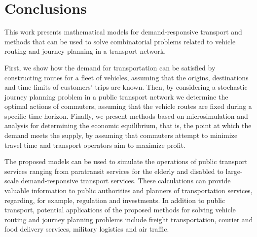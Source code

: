 \documentclass[dissertation,draft*]{aaltoseries}
\begin{document}
\chapter{Conclusions}
\label{conclusions}
This work presents mathematical models for demand-responsive transport and methods
that can be used to solve combinatorial problems related to vehicle routing and journey planning
in a transport network.

First,
we show how the demand for transportation can be satisfied by constructing routes for a fleet of vehicles,
assuming that the origins, destinations and time limits of customers' trips are known.
Then, by considering a stochastic journey planning problem in a public transport network we determine
the optimal actions of commuters, assuming that the vehicle routes are fixed during a specific time horizon.
Finally, we present methods based on microsimulation and analysis
for determining the economic equilibrium, that is, the point at which the demand meets the supply,
by assuming that commuters attempt to minimize travel time and transport operators aim to maximize profit.

The proposed models can be used to simulate the operations of public transport services ranging 
from paratransit services for the elderly and disabled to 
large-scale demand-responsive transport services. These calculations can 
provide valuable information to public authorities and planners of transportation services,
regarding, for example, regulation and investments.
In addition to public transport, potential applications of the proposed methods for solving vehicle routing and journey planning problems
include freight transportation, courier and food delivery services, military logistics and air traffic.

\end{document}
